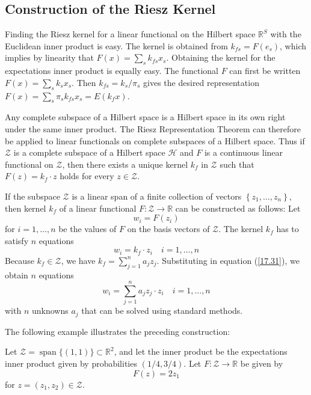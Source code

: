\documentclass[\topdir/lecture\_notes.tex]{subfiles}
\begin{document}
\begin{optional}
\subsection{Construction of the Riesz Kernel}
Finding the Riesz kernel for a linear functional on the Hilbert space $\mathbb{R}^{S}$ with the Euclidean inner product is easy. The kernel is obtained from $k_{f s}=F\left(e_{s}\right)$, which implies by linearity that $F(x)=\sum_{s} k_{f s} x_{s}$. Obtaining the kernel for the expectations inner product is equally easy. The functional $F$ can first be written $F(x)=\sum_{s} k_{s} x_{s}$. Then $k_{f s}=k_{s} / \pi_{s}$ gives the desired representation $F(x)=\sum_{s} \pi_{s} k_{f s} x_{s}=E\left(k_{f} x\right)$.

Any complete subspace of a Hilbert space is a Hilbert space in its own right under the same inner product. The Riesz Representation Theorem can therefore be applied to linear functionals on complete subspaces of a Hilbert space. Thus if $\mathcal{Z}$ is a complete subspace of a Hilbert space $\mathcal{H}$ and $F$ is a continuous linear functional on $\mathcal{Z}$, then there exists a unique kernel $k_{f}$ in $\mathcal{Z}$ such that $F(z)=k_{f} \cdot z$ holds for every $z \in \mathcal{Z}$.

If the subspace $\mathcal{Z}$ is a linear span of a finite collection of vectors $\left\{z_{1}, \ldots, z_{n}\right\}$, then kernel $k_{f}$ of a linear functional $F: \mathcal{Z} \rightarrow \mathbb{R}$ can be constructed as follows: Let
\begin{equation*}
w_{i}=F\left(z_{i}\right) 
\end{equation*}
for $i=1, \ldots, n$ be the values of $F$ on the basis vectors of $\mathcal{Z}$. The kernel $k_{f}$ has to satisfy $n$ equations
\begin{equation}
w_{i}=k_{f} \cdot z_{i} \quad i=1, \ldots, n \label{17.31}
\end{equation}
Because $k_{f} \in \mathcal{Z}$, we have $k_{f}=\sum_{j=1}^{n} a_{j} z_{j}$. Substituting in equation (\ref{17.31}), we obtain $n$ equations
\begin{equation*}
w_{i}=\sum_{j=1}^{n} a_{j} z_{j} \cdot z_{i} \quad i=1, \ldots, n 
\end{equation*}
with $n$ unknowns $a_{j}$ that can be solved using standard methods.

The following example illustrates the preceding construction:
\begin{example}\label{ex:riesz_kernel_construction}
Let $\mathcal{Z}=\operatorname{span}\{(1,1)\} \subset \mathbb{R}^{2}$, and let the inner product be the expectations inner product given by probabilities $(1 / 4,3 / 4)$. Let $F: \mathcal{Z} \rightarrow \mathbb{R}$ be given by
\begin{equation*}
F(z)=2 z_{1} 
\end{equation*}
for $z=\left(z_{1}, z_{2}\right) \in \mathcal{Z}$.


\end{example}
\end{optional}
\end{document}
